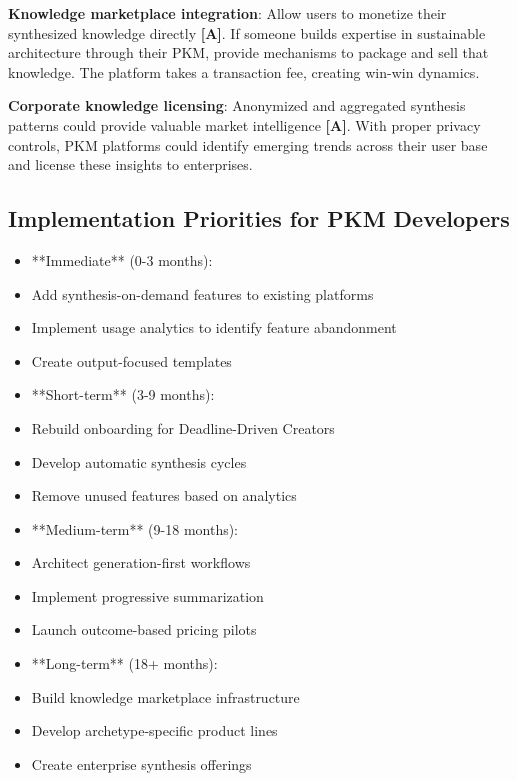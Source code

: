 \documentclass[a4paper,11pt]{article}
\newcommand{\alabel}{\textbf{\textcolor{acolor}{[A]}}}
\begin{document}
\textbf{Knowledge marketplace integration}: Allow users to monetize their synthesized knowledge directly \alabel{}. If someone builds expertise in sustainable architecture through their PKM, provide mechanisms to package and sell that knowledge. The platform takes a transaction fee, creating win-win dynamics.


\textbf{Corporate knowledge licensing}: Anonymized and aggregated synthesis patterns could provide valuable market intelligence \alabel{}. With proper privacy controls, PKM platforms could identify emerging trends across their user base and license these insights to enterprises.


\subsection{Implementation Priorities for PKM Developers}

\begin{itemize}
  \item **Immediate** (0-3 months):
  \item Add synthesis-on-demand features to existing platforms
  \item Implement usage analytics to identify feature abandonment
  \item Create output-focused templates
\end{itemize}

\begin{itemize}
  \item **Short-term** (3-9 months):
  \item Rebuild onboarding for Deadline-Driven Creators
  \item Develop automatic synthesis cycles
  \item Remove unused features based on analytics
\end{itemize}

\begin{itemize}
  \item **Medium-term** (9-18 months):
  \item Architect generation-first workflows
  \item Implement progressive summarization
  \item Launch outcome-based pricing pilots
\end{itemize}

\begin{itemize}
  \item **Long-term** (18+ months):
  \item Build knowledge marketplace infrastructure
  \item Develop archetype-specific product lines
  \item Create enterprise synthesis offerings
\end{itemize}
\end{document}
